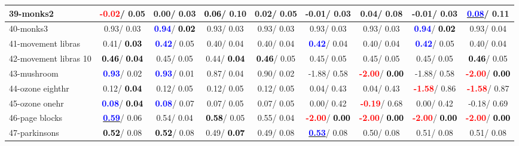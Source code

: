 \begin{table}[h]
\begin{center}
\begin{tabular}{lc|c|c|c|c|c|c|c}
39-monks2 & \textcolor{red}{\textbf{ -0.02}}/  0.05 &   0.00/  0.03 & \textcolor{black}{\textbf{  0.06}}/  0.10 &   0.02/  0.05 &  -0.01/  0.03 &   0.04/  0.08 &  -0.01/  0.03 & \underline{\textcolor{blue}{\textbf{  0.08}}}/  0.11 \\ \hline
40-monks3 &   0.93/  0.03 & \textcolor{blue}{\textbf{  0.94}}/\textcolor{black}{\textbf{  0.02}} &   0.93/  0.03 &   0.93/  0.03 &   0.93/  0.03 &   0.93/  0.03 & \textcolor{blue}{\textbf{  0.94}}/\textcolor{black}{\textbf{  0.02}} &   0.93/  0.04 \\
41-movement libras &   0.41/\textcolor{black}{\textbf{  0.03}} & \textcolor{blue}{\textbf{  0.42}}/  0.05 &   0.40/  0.04 &   0.40/  0.04 & \textcolor{blue}{\textbf{  0.42}}/  0.04 &   0.40/  0.04 & \textcolor{blue}{\textbf{  0.42}}/  0.05 &   0.40/  0.04 \\
42-movement libras 10 & \textcolor{black}{\textbf{  0.46}}/\textcolor{black}{\textbf{  0.04}} &   0.45/  0.05 &   0.44/\textcolor{black}{\textbf{  0.04}} & \textcolor{black}{\textbf{  0.46}}/  0.05 &   0.45/  0.05 &   0.45/  0.05 &   0.45/  0.05 & \textcolor{black}{\textbf{  0.46}}/  0.05 \\
43-mushroom & \textcolor{blue}{\textbf{  0.93}}/  0.02 & \textcolor{blue}{\textbf{  0.93}}/  0.01 &   0.87/  0.04 &   0.90/  0.02 &  -1.88/  0.58 & \textcolor{red}{\textbf{ -2.00}}/\textcolor{black}{\textbf{  0.00}} &  -1.88/  0.58 & \textcolor{red}{\textbf{ -2.00}}/\textcolor{black}{\textbf{  0.00}} \\
44-ozone eighthr &   0.12/\textcolor{black}{\textbf{  0.04}} &   0.12/  0.05 &   0.12/  0.05 &   0.12/  0.05 &   0.04/  0.43 &   0.04/  0.43 & \textcolor{red}{\textbf{ -1.58}}/  0.86 & \textcolor{red}{\textbf{ -1.58}}/  0.87 \\
45-ozone onehr & \textcolor{blue}{\textbf{  0.08}}/\textcolor{black}{\textbf{  0.04}} & \textcolor{blue}{\textbf{  0.08}}/  0.07 &   0.07/  0.05 &   0.07/  0.05 &   0.00/  0.42 & \textcolor{red}{\textbf{ -0.19}}/  0.68 &   0.00/  0.42 &  -0.18/  0.69 \\
46-page blocks & \underline{\textcolor{blue}{\textbf{  0.59}}}/  0.06 &   0.54/  0.04 & \textcolor{black}{\textbf{  0.58}}/  0.05 &   0.55/  0.04 & \textcolor{red}{\textbf{ -2.00}}/\textcolor{black}{\textbf{  0.00}} & \textcolor{red}{\textbf{ -2.00}}/\textcolor{black}{\textbf{  0.00}} & \textcolor{red}{\textbf{ -2.00}}/\textcolor{black}{\textbf{  0.00}} & \textcolor{red}{\textbf{ -2.00}}/\textcolor{black}{\textbf{  0.00}} \\ \hline
47-parkinsons & \textcolor{black}{\textbf{  0.52}}/  0.08 & \textcolor{black}{\textbf{  0.52}}/  0.08 &   0.49/\textcolor{black}{\textbf{  0.07}} &   0.49/  0.08 & \underline{\textcolor{blue}{\textbf{  0.53}}}/  0.08 &   0.50/  0.08 &   0.51/  0.08 &   0.51/  0.08 \\

\end{tabular}
\end{center}
\end{table}
